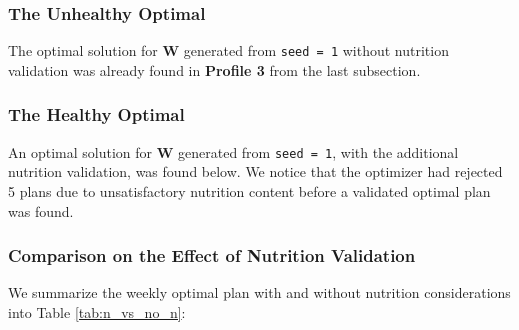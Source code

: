 \documentclass{article}
\newcommand{\bd}[1]{\mathbf{#1}}
\begin{document}
\subsubsection{The Unhealthy Optimal}

The optimal solution for $\bd{W}$ generated from \texttt{seed = 1} without nutrition validation was already found in \textbf{Profile 3} from the last subsection.



\subsubsection{The Healthy Optimal}

An optimal solution for $\bd{W}$ generated from \texttt{seed = 1}, with the additional nutrition validation, was found below. We notice that the optimizer had rejected 5 plans due to unsatisfactory nutrition content before a validated optimal plan was found.



\subsubsection{Comparison on the Effect of Nutrition Validation}

We summarize the weekly optimal plan with and without nutrition considerations into Table \ref{tab:n_vs_no_n}:




\end{document}
